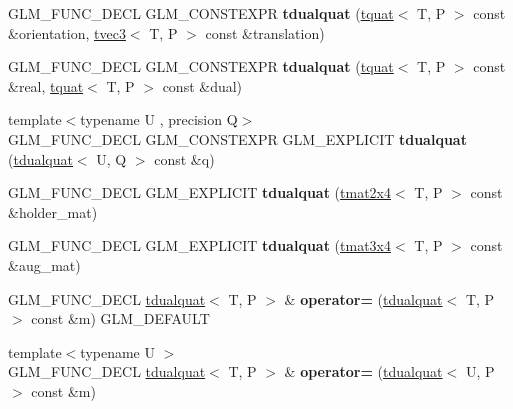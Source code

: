 \begin{DoxyCompactItemize}
G\+L\+M\+\_\+\+F\+U\+N\+C\+\_\+\+D\+E\+CL G\+L\+M\+\_\+\+C\+O\+N\+S\+T\+E\+X\+PR {\bfseries tdualquat} (\hyperlink{structglm_1_1tquat}{tquat}$<$ T, P $>$ const \&orientation, \hyperlink{structglm_1_1tvec3}{tvec3}$<$ T, P $>$ const \&translation)
\item 
\mbox{\label{structglm_1_1tdualquat_a26de194ec794353ab7b5c1e65994c95e}} 
G\+L\+M\+\_\+\+F\+U\+N\+C\+\_\+\+D\+E\+CL G\+L\+M\+\_\+\+C\+O\+N\+S\+T\+E\+X\+PR {\bfseries tdualquat} (\hyperlink{structglm_1_1tquat}{tquat}$<$ T, P $>$ const \&real, \hyperlink{structglm_1_1tquat}{tquat}$<$ T, P $>$ const \&dual)
\item 
\mbox{\label{structglm_1_1tdualquat_a9d75ca4f603fa51106665a5eb46606fe}} 
{\footnotesize template$<$typename U , precision Q$>$ }\\G\+L\+M\+\_\+\+F\+U\+N\+C\+\_\+\+D\+E\+CL G\+L\+M\+\_\+\+C\+O\+N\+S\+T\+E\+X\+PR G\+L\+M\+\_\+\+E\+X\+P\+L\+I\+C\+IT {\bfseries tdualquat} (\hyperlink{structglm_1_1tdualquat}{tdualquat}$<$ U, Q $>$ const \&q)
\item 
\mbox{\label{structglm_1_1tdualquat_a7b6503ed3770426be014ac5aa91d954f}} 
G\+L\+M\+\_\+\+F\+U\+N\+C\+\_\+\+D\+E\+CL G\+L\+M\+\_\+\+E\+X\+P\+L\+I\+C\+IT {\bfseries tdualquat} (\hyperlink{structglm_1_1tmat2x4}{tmat2x4}$<$ T, P $>$ const \&holder\+\_\+mat)
\item 
\mbox{\label{structglm_1_1tdualquat_a826805f42bdbf606ce22f393bfd676f3}} 
G\+L\+M\+\_\+\+F\+U\+N\+C\+\_\+\+D\+E\+CL G\+L\+M\+\_\+\+E\+X\+P\+L\+I\+C\+IT {\bfseries tdualquat} (\hyperlink{structglm_1_1tmat3x4}{tmat3x4}$<$ T, P $>$ const \&aug\+\_\+mat)
\item 
\mbox{\label{structglm_1_1tdualquat_a6481d3d33ee01fda77eb743680bfd8cd}} 
G\+L\+M\+\_\+\+F\+U\+N\+C\+\_\+\+D\+E\+CL \hyperlink{structglm_1_1tdualquat}{tdualquat}$<$ T, P $>$ \& {\bfseries operator=} (\hyperlink{structglm_1_1tdualquat}{tdualquat}$<$ T, P $>$ const \&m) G\+L\+M\+\_\+\+D\+E\+F\+A\+U\+LT
\item 
\mbox{\label{structglm_1_1tdualquat_a88370687edccdd5b6e62c9e314bc95c2}} 
{\footnotesize template$<$typename U $>$ }\\G\+L\+M\+\_\+\+F\+U\+N\+C\+\_\+\+D\+E\+CL \hyperlink{structglm_1_1tdualquat}{tdualquat}$<$ T, P $>$ \& {\bfseries operator=} (\hyperlink{structglm_1_1tdualquat}{tdualquat}$<$ U, P $>$ const \&m)

\end{DoxyCompactItemize}
